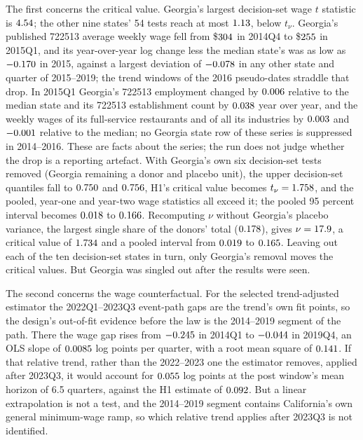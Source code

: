 The first concerns the critical value. Georgia's largest decision-set wage $t$ statistic is
$4.54$; the other nine states' 54 tests reach at most $1.13$, below $t_\nu$. Georgia's published 722513 average weekly wage fell from \$$304$
in 2014Q4 to \$$255$ in 2015Q1, and its year-over-year log change
less the median state's was as low as $-0.170$ in 2015, against a largest deviation of
$-0.078$ in any other state and quarter of 2015--2019; the trend windows of the 2016
pseudo-dates straddle that drop. In 2015Q1 Georgia's 722513 employment changed by
$0.006$ relative to the median state and its 722513 establishment
count by $0.038$ year over year, and the weekly wages of its
full-service restaurants and of all its industries by $0.003$
and $-0.001$ relative to the median; no Georgia state row of these
series is suppressed in 2014--2016. These are facts about the series; the run does not judge whether the
drop is a reporting artefact. With Georgia's own six decision-set tests removed (Georgia remaining
a donor and placebo unit), the upper decision-set quantiles fall to $0.750$ and
$0.756$, H1's critical value becomes $t_\nu = 1.758$, and the
pooled, year-one and year-two wage statistics all exceed it; the pooled 95 percent interval becomes
$0.018$ to $0.166$. Recomputing $\nu$ without Georgia's placebo variance, the
largest single share of the donors' total ($0.178$), gives $\nu = 17.9$, a critical
value of $1.734$ and a pooled interval from $0.019$ to
$0.165$. Leaving out each of the ten decision-set states in turn, only Georgia's removal
moves the critical values. But Georgia was singled out after the results were seen.

The second concerns the wage counterfactual. For the selected trend-adjusted estimator the
2022Q1--2023Q3 event-path gaps are the trend's own fit points, so the design's out-of-fit evidence
before the law is the 2014--2019 segment of the path. There the wage gap rises from
$-0.245$ in 2014Q1 to $-0.044$ in 2019Q4, an OLS slope of
$0.0085$ log points per quarter, with a root mean square of $0.141$. If that
relative trend, rather than the 2022--2023 one the estimator removes, applied after 2023Q3, it
would account for
$0.055$ log points at the post window's mean horizon of 6.5 quarters, against the
H1 estimate of $0.092$. But a linear extrapolation is not a test, and the 2014--2019 segment
contains California's own general minimum-wage ramp, so which relative trend applies after 2023Q3
is not identified.

